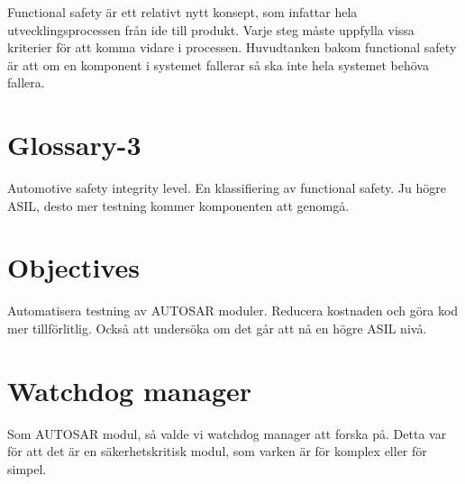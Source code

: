 \documentclass[a4paper]{article}
\begin{document}
Functional safety är ett relativt nytt konsept, som infattar hela
utvecklingsprocessen från ide till produkt. Varje steg måste uppfylla
vissa kriterier för att komma vidare i processen.
Huvudtanken bakom functional safety är att om en komponent i systemet
fallerar så ska inte hela systemet behöva fallera.






\section{Glossary-3}
Automotive safety integrity level. En klassifiering av functional safety.
Ju högre ASIL, desto mer testning kommer komponenten att genomgå.


\section{Objectives}
Automatisera testning av AUTOSAR moduler. Reducera kostnaden och göra
kod mer tillförlitlig. Också att undersöka om det går att nå en högre
ASIL nivå.


\section{Watchdog manager}
Som AUTOSAR modul, så valde vi watchdog manager att forska på.
Detta var för att det är en säkerhetskritisk modul, som varken är för
komplex eller för simpel.

%
%
%
\end{document}
